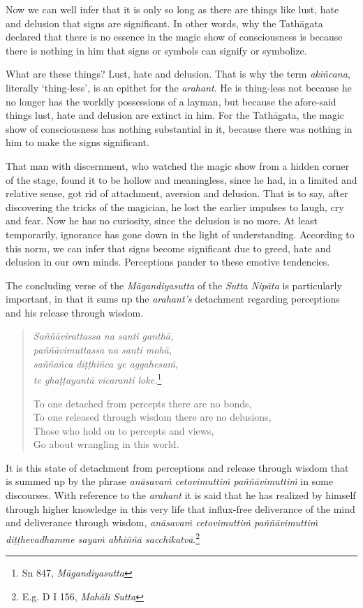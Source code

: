 Now we can well infer that it is only so long as there are things like lust, hate and delusion that signs are significant. In other words, why the Tathāgata declared that there is no essence in the magic show of consciousness is because there is nothing in him that signs or symbols can signify or symbolize.

What are these things? Lust, hate and delusion. That is why the term \emph{akiñcana}, literally `thing-less', is an epithet for the \emph{arahant}. He is thing-less not because he no longer has the worldly possessions of a layman, but because the afore-said things lust, hate and delusion are extinct in him. For the Tathāgata, the magic show of consciousness has nothing substantial in it, because there was nothing in him to make the signs significant.

That man with discernment, who watched the magic show from a hidden corner of the stage, found it to be hollow and meaningless, since he had, in a limited and relative sense, got rid of attachment, aversion and delusion. That is to say, after discovering the tricks of the magician, he lost the earlier impulses to laugh, cry and fear. Now he has no curiosity, since the delusion is no more. At least temporarily, ignorance has gone down in the light of understanding. According to this norm, we can infer that signs become significant due to greed, hate and delusion in our own minds. Perceptions pander to these emotive tendencies.

The concluding verse of the \emph{Māgandiyasutta} of the \emph{Sutta Nipāta} is particularly important, in that it sums up the \emph{arahant's} detachment regarding perceptions and his release through wisdom.

\begin{quote}
\emph{Saññāvirattassa na santi ganthā,}\\
\emph{paññāvimuttassa na santi mohā,}\\
\emph{saññañca diṭṭhiñca ye aggahesuṁ,}\\
\emph{te ghaṭṭayantā vicaranti loke.}\footnote{Sn 847, \emph{Māgandiyasutta}}

To one detached from percepts there are no bonds,\\
To one released through wisdom there are no delusions,\\
Those who hold on to percepts and views,\\
Go about wrangling in this world.
\end{quote}

It is this state of detachment from perceptions and release through wisdom that is summed up by the phrase \emph{anāsavaṁ cetovimuttiṁ paññāvimuttiṁ} in some discourses. With reference to the \emph{arahant} it is said that he has realized by himself through higher knowledge in this very life that influx-free deliverance of the mind and deliverance through wisdom, \emph{anāsavaṁ cetovimuttiṁ paññāvimuttiṁ diṭṭhevadhamme sayaṁ abhiññā sacchikatvā}.\footnote{E.g. D I 156, \emph{Mahāli Sutta}}


